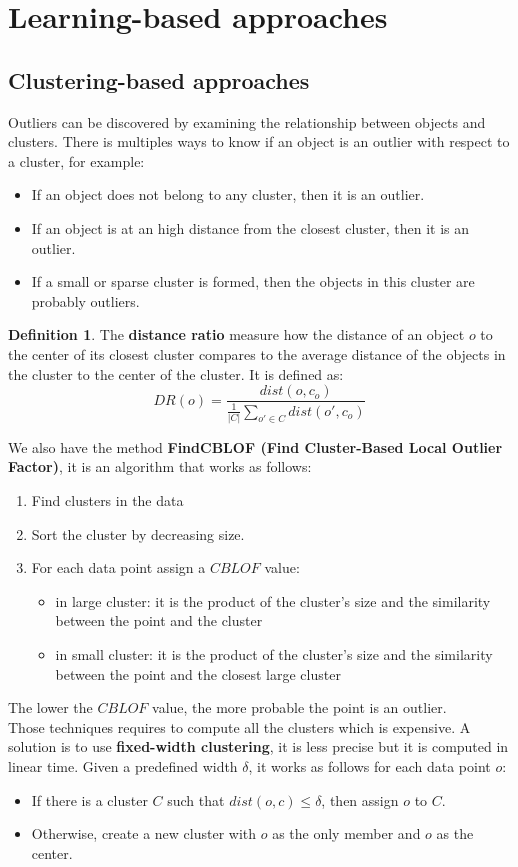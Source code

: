 \documentclass[12pt, openany]{report}
\theoremstyle{definition}
\newtheorem{definition}[thm]{Definition}
\begin{document}
\section{Learning-based approaches}
\subsection{Clustering-based approaches}
Outliers can be discovered by examining the relationship between objects and clusters. There is multiples ways to know if an object is an outlier with respect to a cluster, for example:
\begin{itemize}
    \item If an object does not belong to any cluster, then it is an outlier.
    \item If an object is at an high distance from the closest cluster, then it is an outlier.
    \item If a small or sparse cluster is formed, then the objects in this cluster are probably outliers.
\end{itemize}
\begin{definition}
    The \textbf{distance ratio} measure how the distance of an object $o$ to the center of its closest cluster compares to the average distance of the objects in the cluster to the center of the cluster. It is defined as:
    \begin{equation}
        DR(o) = \frac{dist(o, c_o)}{\frac{1}{|C|} \sum_{o' \in C} dist(o', c_o)}
    \end{equation}
\end{definition}
We also have the method \textbf{FindCBLOF (Find Cluster-Based Local Outlier Factor)}, it is an algorithm that works as follows:
\begin{enumerate}
    \item Find clusters in the data
    \item Sort the cluster by decreasing size.
    \item For each data point assign a $CBLOF$ value:
    \begin{itemize}
        \item in large cluster: it is the product of the cluster’s size and the similarity between the point and the cluster
        \item in small cluster: it is the product of the cluster’s size and the similarity between the point and the closest large cluster
    \end{itemize}
\end{enumerate}
The lower the $CBLOF$ value, the more probable the point is an outlier.\\ 
Those techniques requires to compute all the clusters which is expensive. A solution is to use \textbf{fixed-width clustering}, it is less precise but it is computed in linear time. Given a predefined width $\delta$, it works as follows for each data point $o$:
\begin{itemize}
    \item If there is a cluster $C$ such that $dist(o, c) \leq \delta$, then assign $o$ to $C$.
    \item Otherwise, create a new cluster with $o$ as the only member and $o$ as the center.
\end{itemize}
\end{document}
